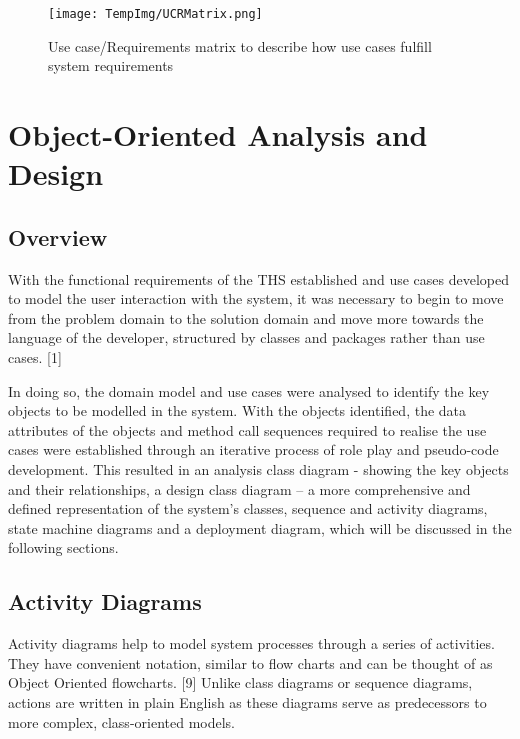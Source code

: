 \documentclass[fontsize=11pt]{extarticle}
\numberwithin{figure}{section} %
\numberwithin{table}{section}%
\begin{document}
\begin{figure}[H]
      \centering
      \texttt{[image: TempImg/UCRMatrix.png]}
      \caption{Use case/Requirements matrix to describe how use cases fulfill system requirements}
 \end{figure}

\hypertarget{object-oriented-analysis-and-design}{%
\section{Object-Oriented Analysis and
Design}\label{object-oriented-analysis-and-design}}

\hypertarget{overview-2}{%
\subsection{Overview}\label{overview-2}}

With the functional requirements of the THS established and use cases
developed to model the user interaction with the system, it was
necessary to begin to move from the problem domain to the solution
domain and move more towards the language of the developer, structured
by classes and packages rather than use cases. {[}1{]}

In doing so, the domain model and use cases were analysed to identify
the key objects to be modelled in the system. With the objects
identified, the data attributes of the objects and method call sequences
required to realise the use cases were established through an iterative
process of role play and pseudo-code development. This resulted in an
analysis class diagram - showing the key objects and their
relationships, a design class diagram -- a more comprehensive and
defined representation of the system's classes, sequence and activity
diagrams, state machine diagrams and a deployment diagram, which will be
discussed in the following sections.

\hypertarget{activity-diagrams}{%
\subsection{Activity Diagrams}\label{activity-diagrams}}

Activity diagrams help to model system processes through a series of
activities. They have convenient notation, similar to flow charts and
can be thought of as Object Oriented flowcharts. {[}9{]} Unlike class
diagrams or sequence diagrams, actions are written in plain English as
these diagrams serve as predecessors to more complex, class-oriented
models.
\end{document}
